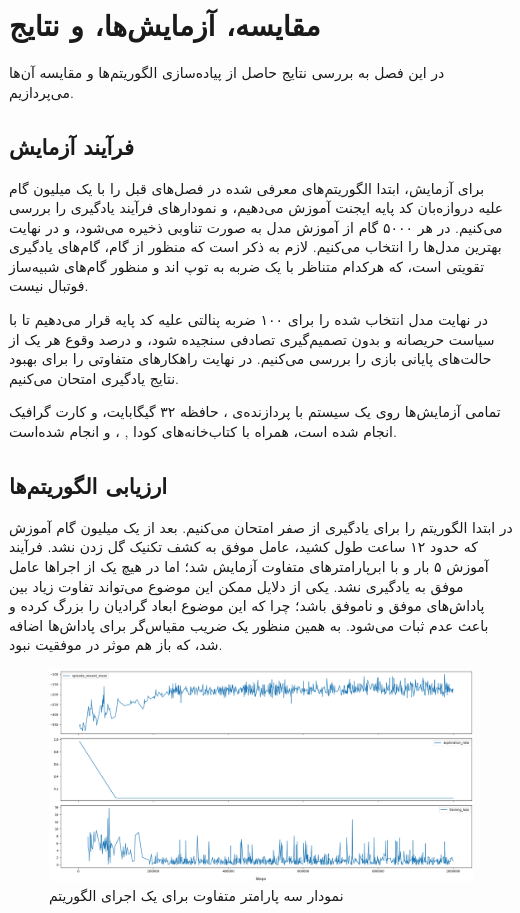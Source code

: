 \chapter{مقایسه، آزمایش‌ها، و نتایج}
در این فصل به بررسی نتایج حاصل از پیاده‌سازی الگوریتم‌ها و مقایسه آن‌ها می‌پردازیم.
\section{فرآیند آزمایش}
برای آزمایش، ابتدا الگوریتم‌های معرفی‌ شده در فصل‌های قبل را با یک میلیون گام علیه دروازه‌بان کد پایه ایجنت
آموزش می‌دهیم، و نمودار‌های فرآیند یادگیری را بررسی می‌کنیم. در هر ۵۰۰۰ گام از آموزش مدل به صورت تناوبی ذخیره می‌شود، و در نهایت بهترین مدل‌ها را انتخاب می‌کنیم.
لازم به ذکر است که منظور از گام، گام‌های یادگیری تقویتی است، که هرکدام متناظر با یک ضربه به توپ اند و منظور گام‌های شبیه‌ساز فوتبال نیست.

در نهایت مدل انتخاب شده را برای ۱۰۰ ضربه پنالتی علیه کد پایه قرار می‌دهیم تا با سیاست حریصانه و بدون تصمیم‌گیری تصادفی سنجیده شود، و درصد وقوع هر یک از حالت‌های پایانی بازی را بررسی می‌کنیم.
در نهایت راهکار‌های متفاوتی را برای بهبود نتایج یادگیری امتحان می‌کنیم.

تمامی آزمایش‌ها روی یک سیستم با پردازنده‌ی ، 
حافظه ۳۲ گیگابایت،
و کارت گرافیک  انجام شده است، 
همراه‌ با کتاب‌خانه‌های کودا 
, ، و 
انجام شده‌است.
\section{ارزیابی الگوریتم‌ها}
در ابتدا الگوریتم  را برای یادگیری از صفر امتحان می‌کنیم.
بعد از یک میلیون گام آموزش که حدود ۱۲ ساعت طول کشید، عامل موفق به کشف تکنیک گل زدن نشد.
فرآیند آموزش ۵ بار و با ابرپارامتر‌های متفاوت آزمایش شد؛ اما در هیچ یک از اجرا‌ها عامل موفق به یادگیری نشد.
یکی از دلایل ممکن این موضوع می‌تواند تفاوت زیاد بین پاداش‌های موفق و ناموفق باشد؛ چرا که این موضوع ابعاد گرادیان را بزرگ کرده و باعث عدم ثبات می‌شود. به همین منظور یک ضریب مقیاس‌گر 
برای پاداش‌ها اضافه شد، که باز هم موثر در موفقیت نبود.

\begin{figure}[H]
    \centering
    \includegraphics[width=1\textwidth]{images/DQN_graphs.png}
    \caption{نمودار سه پارامتر متفاوت برای یک اجرای الگوریتم }\label{fig:dqn_graphs}
\end{figure}

